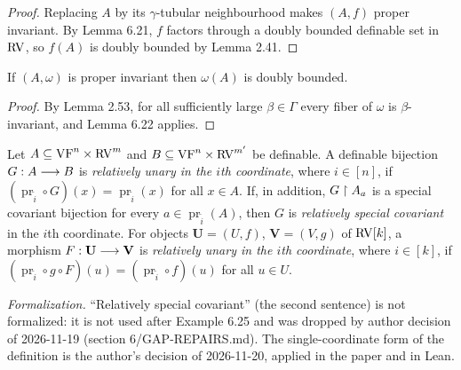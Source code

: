\begin{proof}
\leanok
Replacing $A$ by its $\gamma$-tubular neighbourhood makes $(A,f)$ proper invariant. By Lemma 6.21, $f$ factors through a doubly bounded definable set in $\mathrm{RV}$, so $f(A)$ is doubly bounded by Lemma 2.41.
\end{proof}

\setcounter{theorem}{22}
\begin{corollary}
\label{s6-form-values-db}
\leanok
{}
If $(A,\omega)$ is proper invariant then $\omega(A)$ is doubly bounded.
\end{corollary}

\begin{proof}
\leanok
By Lemma 2.53, for all sufficiently large $\beta\in\Gamma$ every fiber of $\omega$ is $\beta$-invariant, and Lemma 6.22 applies.
\end{proof}

\setcounter{theorem}{23}
\begin{definition}
\label{rela-unary}
\leanok
{}
Let $A\subseteq\mathrm{VF}^n\times\mathrm{RV}^m$ and $B\subseteq\mathrm{VF}^n\times\mathrm{RV}^{m'}$ be definable. A definable bijection $G:A\longrightarrow B$ is \emph{relatively unary in the $i$th coordinate}, where $i\in[n]$, if $(\operatorname{pr}_{\tilde i}\circ G)(x)=\operatorname{pr}_{\tilde i}(x)$ for all $x\in A$. If, in addition, $G\upharpoonright A_a$ is a special covariant bijection for every $a\in\operatorname{pr}_{\tilde i}(A)$, then $G$ is \emph{relatively special covariant} in the $i$th coordinate. For objects $\mathbf{U}=(U,f)$, $\mathbf{V}=(V,g)$ of $\mathrm{RV}[k]$, a morphism $F:\mathbf{U}\longrightarrow\mathbf{V}$ is \emph{relatively unary in the $i$th coordinate}, where $i\in[k]$, if $(\operatorname{pr}_{\tilde i}\circ g\circ F)(u)=(\operatorname{pr}_{\tilde i}\circ f)(u)$ for all $u\in U$.

\emph{Formalization.} ``Relatively special covariant'' (the second sentence) is not formalized: it is not used after Example 6.25 and was dropped by author decision of 2026-11-19 (section 6/GAP-REPAIRS.md). The single-coordinate form of the definition is the author's decision of 2026-11-20, applied in the paper and in Lean.
\end{definition}

